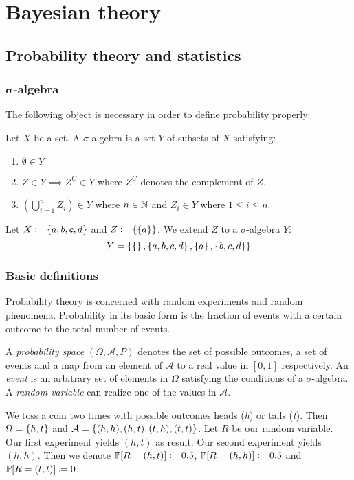 \chapter{Bayesian theory}
\section{Probability theory and statistics}
\subsection{$\boldsymbol\sigma$-algebra}
%
The following object is necessary in order to define probability properly:

\begin{definition}
  Let $X$ be a set. A $\sigma$-algebra is a set $Y$ of subsets of $X$ satisfying:
  \begin{enumerate}
    \item $\emptyset \in Y$
    \item $Z \in Y \implies Z^C \in Y$ where $Z^C$ denotes the complement of $Z$.
    \item $\left(\bigcup_{i=1}^n Z_i\right) \in Y$ where $n \in \mathbb N$ and $Z_i \in Y$ where $1 \leq i \leq n$.
  \end{enumerate}
\end{definition}
\begin{example}
  Let $X \coloneqq \left\{a, b, c, d\right\}$ and $Z \coloneqq \left\{\left\{a\right\}\right\}$. We extend $Z$ to a $\sigma$-algebra $Y$:
  \[ Y = \left\{\left\{\right\}, \left\{a,b,c,d\right\}, \left\{a\right\}, \left\{b,c,d\right\}\right\} \]
\end{example}

\subsection{Basic definitions}
\label{sec:bp-def}
%
Probability theory is concerned with random experiments and random phenomena. Probability in its basic form is the fraction of events with a certain outcome to the total number of events.

\begin{definition}
  A \emph{probability space} $(\Omega, \mathcal A, P)$ denotes
    the set of possible outcomes, a set of events and a map from an element of $\mathcal A$ to a real value in $[0,1]$ respectively.
  An \emph{event} is an arbitrary set of elements in $\Omega$ satisfying the conditions of a $\sigma$-algebra.
  A \emph{random variable} can realize one of the values in $\mathcal A$.
\end{definition}
\begin{example}
  We toss a coin two times with possible outcomes heads (\textit h) or tails (\textit t). Then $\Omega = \left\{h,t\right\}$ and $\mathcal A = \left\{(h, h), (h, t), (t, h), (t, t)\right\}$.
  Let $R$ be our random variable. Our first experiment yields $(h, t)$ as result. Our second experiment yields $(h, h)$.
  Then we denote $\mathbb P[R=(h,t)] \coloneqq 0.5$, $\mathbb P[R=(h,h)] \coloneqq 0.5$ and $\mathbb P[R=(t,t)] \coloneqq 0$.
\end{example}

